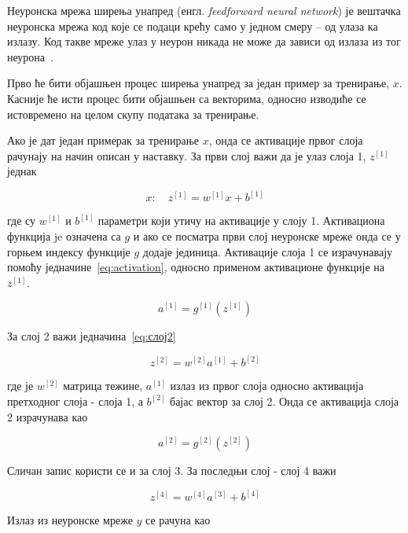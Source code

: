 \documentclass[master]{finthesis}
\begin{document}
Неуронска мрежа ширења унапред (енгл. \textit{feedforward neural network}) је вештачка неуронска мрежа код које се подаци крећу само у једном смеру -- од улаза ка излазу. Код такве мреже улаз у неурон никада не може да зависи од излаза из тог неурона~\cite{mit_intro_ml_lecture22}.

Прво ће бити објашњен процес ширења унапред за један пример за тренирање, $x$. Касније ће исти процес бити објашњен са векторима, односно изводиће се истовремено на целом скупу података за тренирање. 

Ако је дат један примерак за тренирање $x$, онда се активације првог слоја рачунају на начин описан у наставку. За први слој важи да је улаз слоја 1, $z^{[1]}$ једнак

\begin{equation}
x:\quad z^{[1]} = w^{[1]}x + b^{[1]}
\label{eq:activation_layer1}
\end{equation}

где су $w^{[1]}$ и  $b^{[1]}$ параметри који  утичу на активације у слоју 1. Активациона функција je означена са $g$ и ако се посматра први слој неуронске мреже онда се у горњем индексу функције $g$ додаје јединица. Активације слоја 1 се израчунавају помоћу једначине~\eqref{eq:activation}, односно применом активационе функције на $z^{[1]}$.  

\begin{equation}
a^{[1]} = g^{[1]}(z^{[1]})
\label{eq:activation}
\end{equation}

За слој 2 важи једначина~\eqref{eq:слој2}

\begin{equation}
z^{[2]} = w^{[2]}a^{[1]} + b^{[2]}
\label{eq:слој2}
\end{equation}

где је $w^{[2]}$ матрица тежине, $a^{[1]}$ излаз из првог слоја односно активација претходног слоја - слоја 1, а $b^{[2]}$ бајас вектор за слој 2. Онда се активација слоја 2 израчунава као 

\begin{equation}
a^{[2]} = g^{[2]}(z^{[2]})
\end{equation}

Сличан запис користи се и за слој 3. За последњи слој - слој 4 важи

\begin{equation}
z^{[4]} = w^{[4]}a^{[3]} + b^{[4]}
\end{equation}

Излаз из неуронске мреже $\hat{y}$ се рачуна као
\end{document}
